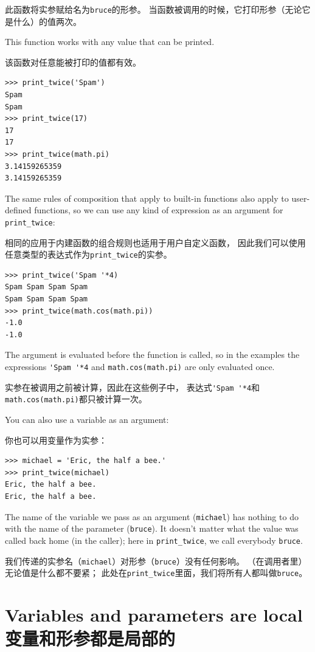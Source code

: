 \documentclass[10pt]{book}
\begin{document}
\begin{CJK}{UTF8}{gbsn}
此函数将实参赋给名为{\tt bruce}的形参。
当函数被调用的时候，它打印形参（无论它是什么）的值两次。

This function works with any value that can be printed.

该函数对任意能被打印的值都有效。

\begin{verbatim}
>>> print_twice('Spam')
Spam
Spam
>>> print_twice(17)
17
17
>>> print_twice(math.pi)
3.14159265359
3.14159265359
\end{verbatim}
%
The same rules of composition that apply to built-in functions also
apply to user-defined functions, so we can use any kind of expression
as an argument for \verb"print_twice":

相同的应用于内建函数的组合规则也适用于用户自定义函数，
因此我们可以使用任意类型的表达式作为\verb"print_twice"的实参。

\begin{verbatim}
>>> print_twice('Spam '*4)
Spam Spam Spam Spam
Spam Spam Spam Spam
>>> print_twice(math.cos(math.pi))
-1.0
-1.0
\end{verbatim}
%
The argument is evaluated before the function is called, so
in the examples the expressions \verb"'Spam '*4" and
{\tt math.cos(math.pi)} are only evaluated once.

实参在被调用之前被计算，因此在这些例子中，
表达式\verb"'Spam '*4"和{\tt math.cos(math.pi)}都只被计算一次。

You can also use a variable as an argument:

你也可以用变量作为实参：

\begin{verbatim}
>>> michael = 'Eric, the half a bee.'
>>> print_twice(michael)
Eric, the half a bee.
Eric, the half a bee.
\end{verbatim}
%
The name of the variable we pass as an argument ({\tt michael}) has
nothing to do with the name of the parameter ({\tt bruce}).  It
doesn't matter what the value was called back home (in the caller);
here in \verb"print_twice", we call everybody {\tt bruce}.

我们传递的实参名（{\tt michael}）对形参（{\tt bruce}）没有任何影响。
（在调用者里）无论值是什么都不要紧；
此处在\verb"print_twice"里面，我们将所有人都叫做{\tt bruce}。


\section{Variables and parameters are local 变量和形参都是局部的}


\end{CJK}
\end{document}
